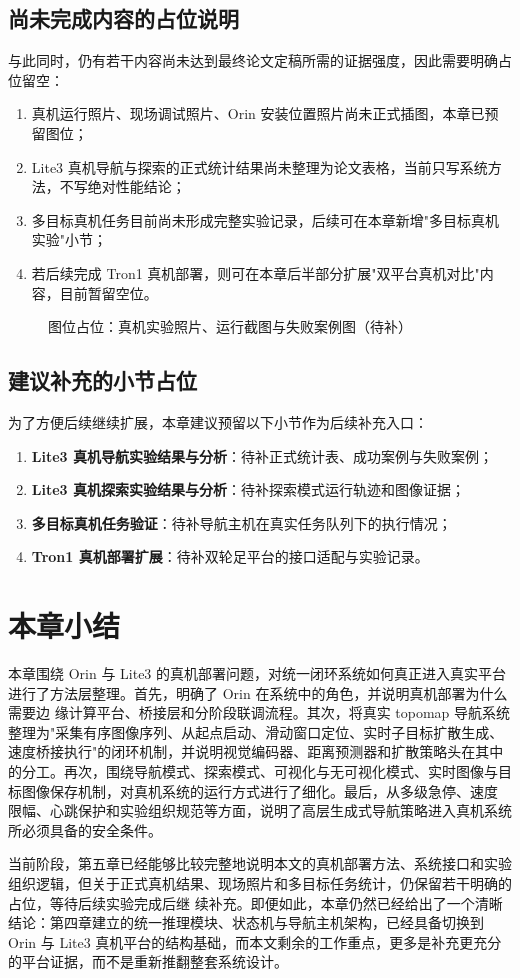 \subsection{尚未完成内容的占位说明}

与此同时，仍有若干内容尚未达到最终论文定稿所需的证据强度，因此需要明确占位留空：

\begin{enumerate}
    \item 真机运行照片、现场调试照片、Orin 安装位置照片尚未正式插图，本章已预留图位；
    \item Lite3 真机导航与探索的正式统计结果尚未整理为论文表格，当前只写系统方法，不写绝对性能结论；
    \item 多目标真机任务目前尚未形成完整实验记录，后续可在本章新增"多目标真机实验"小节；
    \item 若后续完成 Tron1 真机部署，则可在本章后半部分扩展"双平台真机对比"内容，目前暂留空位。
\end{enumerate}

\begin{figure}[htbp]
    \centering
    \fbox{\rule{0pt}{58mm}\rule{0.86\linewidth}{0pt}}
    \caption{图位占位：真机实验照片、运行截图与失败案例图（待补）}
    \label{fig:real-pending-placeholder}
\end{figure}

\subsection{建议补充的小节占位}

为了方便后续继续扩展，本章建议预留以下小节作为后续补充入口：

\begin{enumerate}
    \item \textbf{Lite3 真机导航实验结果与分析}：待补正式统计表、成功案例与失败案例；
    \item \textbf{Lite3 真机探索实验结果与分析}：待补探索模式运行轨迹和图像证据；
    \item \textbf{多目标真机任务验证}：待补导航主机在真实任务队列下的执行情况；
    \item \textbf{Tron1 真机部署扩展}：待补双轮足平台的接口适配与实验记录。
\end{enumerate}

\section{本章小结}

本章围绕 Orin 与 Lite3 的真机部署问题，对统一闭环系统如何真正进入真实平台进行了方法层整理。首先，明确了 Orin 在系统中的角色，并说明真机部署为什么需要边
缘计算平台、桥接层和分阶段联调流程。其次，将真实 topomap 导航系统整理为"采集有序图像序列、从起点启动、滑动窗口定位、实时子目标扩散生成、速度桥接执行"的闭环机制，并说明视觉编码器、距离预测器和扩散策略头在其中的分工。再次，围绕导航模式、探索模式、可视化与无可视化模式、实时图像与目标图像保存机制，对真机系统的运行方式进行了细化。最后，从多级急停、速度
限幅、心跳保护和实验组织规范等方面，说明了高层生成式导航策略进入真机系统所必须具备的安全条件。

当前阶段，第五章已经能够比较完整地说明本文的真机部署方法、系统接口和实验组织逻辑，但关于正式真机结果、现场照片和多目标任务统计，仍保留若干明确的占位，等待后续实验完成后继
续补充。即便如此，本章仍然已经给出了一个清晰结论：第四章建立的统一推理模块、状态机与导航主机架构，已经具备切换到 Orin 与 Lite3
真机平台的结构基础，而本文剩余的工作重点，更多是补充更充分的平台证据，而不是重新推翻整套系统设计。
